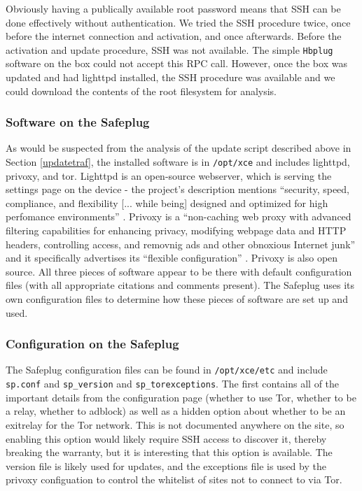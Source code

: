 Obviously having a publically available root password means that SSH can be done effectively without authentication.  We tried the SSH procedure twice, once before the internet connection and activation, and once afterwards.  Before the activation and update procedure, SSH was not available.  The simple \verb!Hbplug! software on the box could not accept this RPC call.  However, once the box was updated and had lighttpd installed, the SSH procedure was available and we could download the contents of the root filesystem for analysis.

    \subsubsection{Software on the Safeplug}
\label{software}
As would be suspected from the analysis of the update script described above in Section \ref{updatetraf}, the installed software is in \verb!/opt/xce! and includes lighttpd, privoxy, and tor.  Lighttpd is an open-source webserver, which is serving the settings page on the device - the project's description mentions ``security, speed, compliance, and flexibility [... while being] designed and optimized for high perfomance environments'' \cite{lighttpd}.  Privoxy is a ``non-caching web proxy with advanced filtering capabilities for enhancing privacy, modifying webpage data and HTTP headers, controlling access, and removnig ads and other obnoxious Internet junk'' and it specifically advertises its ``flexible configuration'' \cite{privoxy}.  Privoxy is also open source.  All three pieces of software appear to be there with default configuration files (with all appropriate citations and comments present).  The Safeplug uses its own configuration files to determine how these pieces of software are set up and used.
    
    \subsubsection{Configuration on the Safeplug}
    \label{spconfig}
The Safeplug configuration files can be found in \verb!/opt/xce/etc! and include \verb!sp.conf! and \verb!sp_version! and \verb!sp_torexceptions!.  The first contains all of the important details from the configuration page (whether to use Tor, whether to be a relay, whether to adblock) as well as a hidden option about whether to be an exitrelay for the Tor network.  This is not documented anywhere on the site, so enabling this option would likely require SSH access to discover it, thereby breaking the warranty, but it is interesting that this option is available.  The version file is likely used for updates, and the exceptions file is used by the privoxy configuation to control the whitelist of sites not to connect to via Tor.

